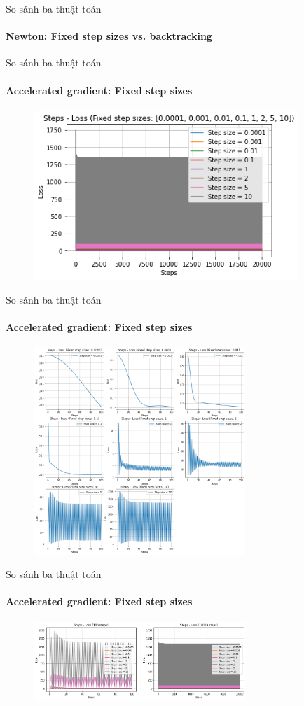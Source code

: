 \documentclass[10pt]{beamer}
\theoremstyle{remark}
\theoremstyle{definition}
\begin{document}
\begin{frame}{So sánh ba thuật toán}
	\framesubtitle{Newton: Fixed step sizes vs. backtracking}

\end{frame}

\begin{frame}{So sánh ba thuật toán}
	\framesubtitle{Accelerated gradient: Fixed step sizes}

	\begin{figure}
		\centering
		\includegraphics[width=10cm]{Thinh/13.png}
	\end{figure}

\end{frame}
\begin{frame}{So sánh ba thuật toán}
	\framesubtitle{Accelerated gradient: Fixed step sizes}

	\begin{figure}
		\centering
		\includegraphics[width=8cm]{Thinh/14.png}
	\end{figure}

\end{frame}
\begin{frame}{So sánh ba thuật toán}
	\framesubtitle{Accelerated gradient: Fixed step sizes}

	\begin{figure}
		\centering
		\includegraphics[width=8cm]{Thinh/15.png}
	\end{figure}

\end{frame}
\end{document}
